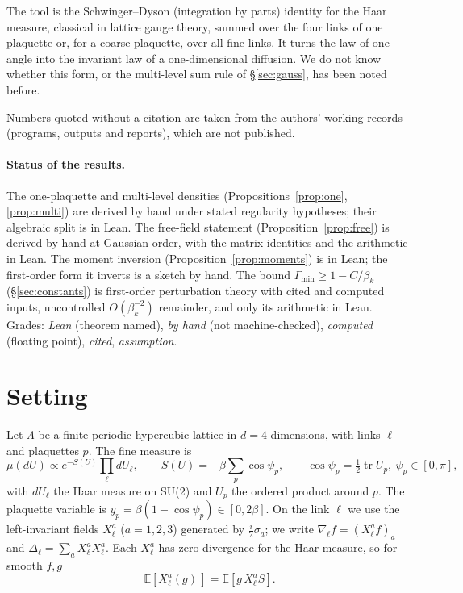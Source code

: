 \documentclass[11pt,a4paper]{article}
\theoremstyle{definition}
\theoremstyle{remark}
\newcommand{\E}{\mathbb{E}}
\begin{document}
The tool is the Schwinger--Dyson (integration by parts) identity for the Haar measure, classical in lattice gauge theory, summed over the four links of one plaquette or, for a coarse plaquette, over all fine links. It turns the law of one angle into the invariant law of a one-dimensional diffusion. We do not know whether this form, or the multi-level sum rule of \S\ref{sec:gauss}, has been noted before.

Numbers quoted without a citation are taken from the authors' working records (programs, outputs and reports), which are not published.

\paragraph{Status of the results.} The one-plaquette and multi-level densities (Propositions~\ref{prop:one}, \ref{prop:multi}) are derived by hand under stated regularity hypotheses; their algebraic split is in Lean. The free-field statement (Proposition~\ref{prop:free}) is derived by hand at Gaussian order, with the matrix identities and the arithmetic in Lean. The moment inversion (Proposition~\ref{prop:moments}) is in Lean; the first-order form it inverts is a sketch by hand. The bound $\Gamma_{\min}\ge1-C/\beta_k$ (\S\ref{sec:constants}) is first-order perturbation theory with cited and computed inputs, uncontrolled $O(\beta_k^{-2})$ remainder, and only its arithmetic in Lean. Grades: \emph{Lean} (theorem named), \emph{by hand} (not machine-checked), \emph{computed} (floating point), \emph{cited}, \emph{assumption}.

\section{Setting}\label{sec:setting}

Let $\Lambda$ be a finite periodic hypercubic lattice in $d=4$ dimensions, with links $\ell$ and plaquettes $p$. The fine measure is
\[
\mu(dU)\propto e^{-S(U)}\prod_\ell dU_\ell,\qquad S(U)=-\beta\sum_p\cos\psi_p,\qquad \cos\psi_p=\tfrac12\operatorname{tr}U_p,\ \psi_p\in[0,\pi],
\]
with $dU_\ell$ the Haar measure on SU(2) and $U_p$ the ordered product around $p$. The plaquette variable is $y_p=\beta(1-\cos\psi_p)\in[0,2\beta]$. On the link $\ell$ we use the left-invariant fields $X^a_\ell$ ($a=1,2,3$) generated by $\tfrac{i}{2}\sigma_a$; we write $\nabla_\ell f=(X^a_\ell f)_a$ and $\Delta_\ell=\sum_aX^a_\ell X^a_\ell$. Each $X^a_\ell$ has zero divergence for the Haar measure, so for smooth $f,g$
\begin{equation}\label{eq:ibp}
\E[X^a_\ell(g)\,]=\E[g\,X^a_\ell S].
\end{equation}
\end{document}
